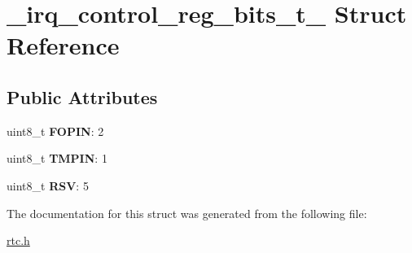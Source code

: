 \hypertarget{struct__irq__control__reg__bits__t__}{}\section{\+\_\+irq\+\_\+control\+\_\+reg\+\_\+bits\+\_\+t\+\_\+ Struct Reference}
\label{struct__irq__control__reg__bits__t__}
\subsection*{Public Attributes}
\begin{DoxyCompactItemize}
\item 
\mbox{\label{struct__irq__control__reg__bits__t___a33c62c0932aa316efd4d53abd6c01fc5}} 
uint8\+\_\+t {\bfseries F\+O\+P\+IN}\+: 2
\item 
\mbox{\label{struct__irq__control__reg__bits__t___a40f5e2bf62fe1901af71dee45b9b9a70}} 
uint8\+\_\+t {\bfseries T\+M\+P\+IN}\+: 1
\item 
\mbox{\label{struct__irq__control__reg__bits__t___aa91f0c9cadc1f646c616b58dd7f580ab}} 
uint8\+\_\+t {\bfseries R\+SV}\+: 5
\end{DoxyCompactItemize}


The documentation for this struct was generated from the following file\+:\begin{DoxyCompactItemize}
\item 
\hyperlink{rtc_8h}{rtc.\+h}\end{DoxyCompactItemize}
